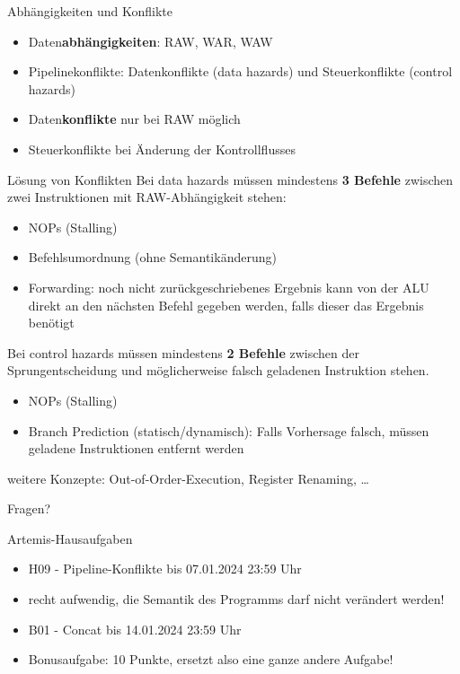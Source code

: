 \documentclass[
  german,            %
  aspectratio=169,    %
]{tumbeamer}
\begin{document}
\begin{frame}[c, fragile]{Abhängigkeiten und Konflikte}{}
  \begin{itemize}
    \item Daten\textbf{abhängigkeiten}: RAW, WAR, WAW
    \item Pipelinekonflikte: Datenkonflikte (data hazards) und Steuerkonflikte (control hazards)
    \item Daten\textbf{konflikte} nur bei RAW möglich
    \item Steuerkonflikte bei Änderung der Kontrollflusses
  \end{itemize}
\end{frame}

\begin{frame}[c, fragile]{Lösung von Konflikten}
  Bei data hazards müssen mindestens \textbf{3 Befehle} zwischen zwei Instruktionen mit RAW-Abhängigkeit stehen:
  \begin{itemize}
    \item NOPs (Stalling)
    \item Befehlsumordnung (ohne Semantikänderung)
    \item Forwarding: noch nicht zurückgeschriebenes Ergebnis kann von der ALU direkt an den nächsten Befehl gegeben werden, falls dieser das Ergebnis benötigt
  \end{itemize}
  \vspace{0.5cm}
  Bei control hazards müssen mindestens \textbf{2 Befehle} zwischen der Sprungentscheidung und möglicherweise falsch geladenen Instruktion stehen.
  \begin{itemize}
    \item NOPs (Stalling)
    \item Branch Prediction (statisch/dynamisch): Falls Vorhersage falsch, müssen geladene Instruktionen entfernt werden
  \end{itemize}
  \vspace{0.5cm}
  weitere Konzepte: Out-of-Order-Execution, Register Renaming, \ldots
\end{frame}

\begin{frame}[c]{}{}
  \begin{center}
    \LARGE Fragen?
  \end{center}
\end{frame}

\begin{frame}[c, fragile]{Artemis-Hausaufgaben}{}
  \begin{itemize}
    \item H09 - Pipeline-Konflikte bis 07.01.2024 23:59 Uhr
    \item recht aufwendig, die Semantik des Programms darf nicht verändert werden!
    \item B01 - Concat bis 14.01.2024 23:59 Uhr
    \item Bonusaufgabe: 10 Punkte, ersetzt also eine ganze andere Aufgabe!
  \end{itemize}
\end{frame}
\end{document}
